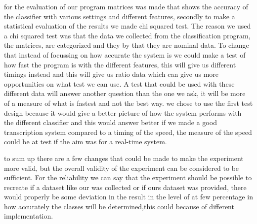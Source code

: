 
for the evaluation of our program matrices was made that shows the accuracy of the classifier with various settings and different features, secondly to make a statistical evaluation of the results we made chi squared test. The reason we used a chi squared test was that the data we collected from the classification program, the matrices, are categorized and they by that they are nominal data. To change that instead of focussing on how accurate the system is we could make a test of how fast the program is with the different features, this will give us different timings instead and this will give us ratio data which can give us more opportunities on what test we can use. A test that could be used with these different data will answer another question than the one we ask, it will be more of a measure of what is fastest and not the best way. we chose to use the first test design because it would give a better picture of how the system performs with the different classifier and this would answer better if we made a good transcription system compared to a timing of the speed, the measure of the speed could be at test if the aim was for a real-time system.


to sum up there are a few changes that could be made to make the experiment more valid, but the overall validity of the experiment can be considered to be sufficient. For the reliability we can say that the experiment should be possible to recreate if a dataset like our was collected or if ours dataset was provided, there would properly be some deviation in the result in the level of at few percentage in how accurately the classes will be determined,this could because of different implementation.